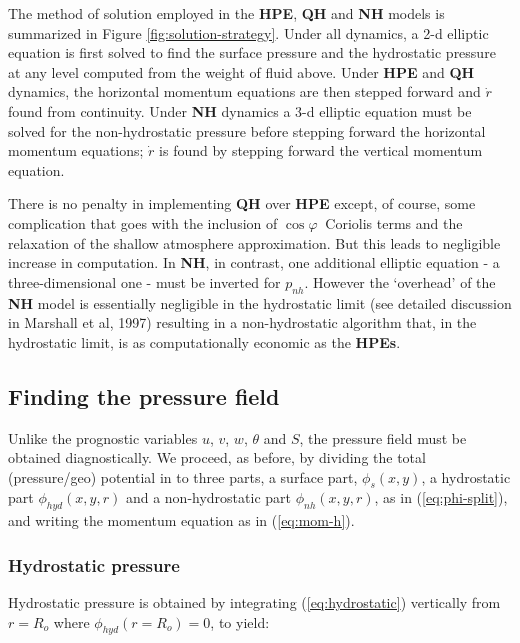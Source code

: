 The method of solution employed in the \textbf{HPE}, \textbf{QH} and \textbf{
NH} models is summarized in Figure \ref{fig:solution-strategy}.
Under all dynamics, a 2-d elliptic equation is
first solved to find the surface pressure and the hydrostatic pressure at
any level computed from the weight of fluid above. Under \textbf{HPE} and 
\textbf{QH} dynamics, the horizontal momentum equations are then stepped
forward and $\dot{r}$ found from continuity. Under \textbf{NH} dynamics a
3-d elliptic equation must be solved for the non-hydrostatic pressure before
stepping forward the horizontal momentum equations; $\dot{r}$ is found by
stepping forward the vertical momentum equation.



There is no penalty in implementing \textbf{QH} over \textbf{HPE} except, of
course, some complication that goes with the inclusion of $\cos \varphi \ $
Coriolis terms and the relaxation of the shallow atmosphere approximation.
But this leads to negligible increase in computation. In \textbf{NH}, in
contrast, one additional elliptic equation - a three-dimensional one - must
be inverted for $p_{nh}$. However the `overhead' of the \textbf{NH} model is
essentially negligible in the hydrostatic limit (see detailed discussion in
Marshall et al, 1997) resulting in a non-hydrostatic algorithm that, in the
hydrostatic limit, is as computationally economic as the \textbf{HPEs}.

\subsection{Finding the pressure field}
\label{sec:finding_the_pressure_field}

Unlike the prognostic variables $u$, $v$, $w$, $\theta $ and $S$, the
pressure field must be obtained diagnostically. We proceed, as before, by
dividing the total (pressure/geo) potential in to three parts, a surface
part, $\phi _{s}(x,y)$, a hydrostatic part $\phi _{hyd}(x,y,r)$ and a
non-hydrostatic part $\phi _{nh}(x,y,r)$, as in (\ref{eq:phi-split}), and
writing the momentum equation as in (\ref{eq:mom-h}).

\subsubsection{Hydrostatic pressure}

Hydrostatic pressure is obtained by integrating (\ref{eq:hydrostatic})
vertically from $r=R_{o}$ where $\phi _{hyd}(r=R_{o})=0$, to yield:

